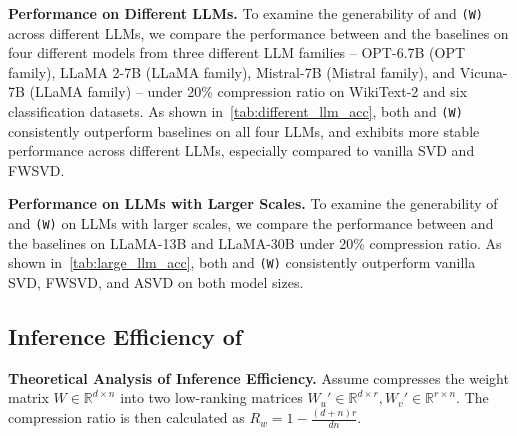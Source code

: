 

\begin{figure} %
  \centering
  \vspace{-5mm}
  \largellmaccuracyTable
\end{figure}

\textbf{Performance on Different LLMs.} To examine the generability of \sysname and \sysname \texttt{(W)} across different LLMs, we compare the performance between \sysname and the baselines on four different models from three different LLM families -- OPT-6.7B (OPT family), LLaMA 2-7B (LLaMA family), Mistral-7B (Mistral family), and Vicuna-7B (LLaMA family)  -- under 20\% compression ratio on WikiText-2 and six classification datasets. 
%
As shown in~\cref{tab:different_llm_acc}, both \sysname and \sysname \texttt{(W)} consistently outperform baselines on all four LLMs, and exhibits more stable performance across different LLMs, especially compared to vanilla SVD and FWSVD.

\textbf{Performance on LLMs with Larger Scales.} To examine the generability of \sysname and \sysname \texttt{(W)} on LLMs with larger scales, we compare the performance between \sysname and the baselines on LLaMA-13B and LLaMA-30B under 20\% compression ratio. As shown in~\cref{tab:large_llm_acc}, both \sysname and \sysname \texttt{(W)} consistently outperform vanilla SVD, FWSVD, and ASVD on both model sizes. 


\vspace{-1mm}
\subsection{Inference Efficiency of \sysname }
\label{subsec:inference_speedup}
\vspace{-1mm}

\textbf{Theoretical Analysis of Inference Efficiency.} Assume \sysname compresses the weight matrix {\small$W \in \mathbb{R}^{d \times n}$} into two low-ranking matrices {\small$W_u' \in \mathbb{R}^{d \times r}, W_v' \in \mathbb{R}^{r \times n}$}. The compression ratio is then calculated as {\small$R_w = 1-\frac{(d+n) r}{d n}$}.

